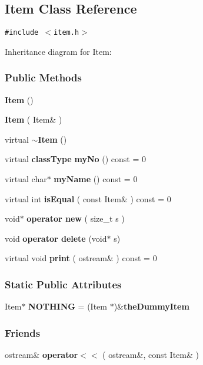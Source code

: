 \subsection{Item  Class Reference}
\label{Item}
{\tt \#include $<$item.h$>$}

Inheritance diagram for Item:\begin{figure}[H]
\begin{center}
\leavevmode
\setlength{\epsfysize}{5.10638cm}
\end{center}
\end{figure}
\subsubsection*{Public Methods}
\begin{CompactItemize}
\item 
{\bf Item} ()
\item 
{\bf Item} ( Item\& )
\item 
virtual {\bf $\sim$Item} ()
\item 
virtual {\bf class\-Type} {\bf my\-No} () const = 0
\item 
virtual char$\ast$ {\bf my\-Name} () const = 0
\item 
virtual int {\bf is\-Equal} ( const Item\& ) const = 0
\item 
void$\ast$ {\bf operator new} ( size\_\-t s )
\item 
void {\bf operator delete} (void$\ast$ s)
\item 
virtual void {\bf print} ( ostream\& ) const = 0
\end{CompactItemize}
\subsubsection*{Static Public Attributes}
\begin{CompactItemize}
\item 
Item$\ast$ {\bf NOTHING} = (Item $\ast$)\&{\bf the\-Dummy\-Item}
\end{CompactItemize}
\subsubsection*{Friends}
\begin{CompactItemize}
\item 
ostream\& {\bf operator$<$$<$} ( ostream\&, const Item\& )
\end{CompactItemize}


